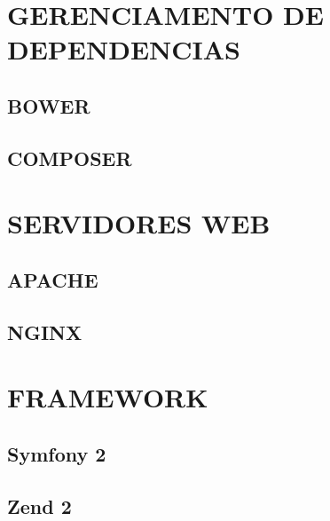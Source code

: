\documentclass[12pt,floatnumber=continuous,espaco=umemeio]{abnt}
\begin{document}
 
	
	\capa 
	\folhaderosto 
	
	
  
	
	\indices

	
	
	
	
	
	
	
	
	
	
	\newpage
	
	\chapter{GERENCIAMENTO DE DEPENDENCIAS}
	\section{BOWER}
	\section{COMPOSER}
	
	\chapter{SERVIDORES WEB}
	\section{APACHE}
	\section{NGINX}
	
	\chapter{FRAMEWORK}
	\section{Symfony 2}
	\section{Zend 2}
	
	
	
	 
	
\end{document}
